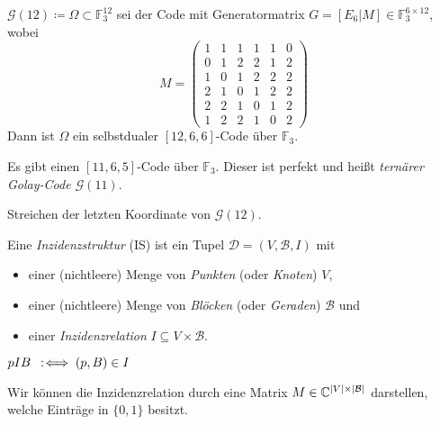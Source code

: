\documentclass{cheat-sheet}
\newcommand{\F}{\mathbb{F}} %
\newcommand{\Golay}{\mathcal{G}} %
\newcommand{\Design}{\mathcal{D}} %
\newcommand{\Blocks}{\mathcal{B}} %
\begin{document}

\begin{satz}
  $\Golay(12) \coloneqq \Omega \subset \F_3^{12}$ sei der Code mit Generatormatrix $G=[E_6|M] \in \F_3^{6 \times 12}$, wobei
  \[
    M = \begin{pmatrix}
      1 & 1 & 1 & 1 & 1 & 0 \\
      0 & 1 & 2 & 2 & 1 & 2 \\
      1 & 0 & 1 & 2 & 2 & 2 \\
      2 & 1 & 0 & 1 & 2 & 2 \\
      2 & 2 & 1 & 0 & 1 & 2 \\
      1 & 2 & 2 & 1 & 0 & 2
    \end{pmatrix}
  \]
  Dann ist $\Omega$ ein selbstdualer $[12, 6, 6]$-Code über $\F_3$.
\end{satz}


\begin{satz}
  Es gibt einen $[11, 6, 5]$-Code über $\F_3$. Dieser ist perfekt und heißt \emph{ternärer Golay-Code $\Golay(11)$}.
\end{satz}

\begin{konstr}
  Streichen der letzten Koordinate von $\Golay(12)$.
\end{konstr}


\begin{defn}
  Eine \emph{Inzidenzstruktur} (IS) ist ein Tupel $\Design = (V, \Blocks, I)$ mit
  \begin{itemize}
    \item einer (nichtleere) Menge von \emph{Punkten} (oder \textit{Knoten}) $V$,
    \item einer (nichtleere) Menge von \emph{Blöcken} (oder \textit{Geraden}) $\Blocks$ und
    \item einer \emph{Inzidenzrelation} $I \subseteq V \times \Blocks$.
  \end{itemize}
\end{defn}

\begin{nota}
  $p I B \enspace:\!\iff (p, B) \in I$
\end{nota}

\begin{bem}
  Wir können die Inzidenzrelation durch eine Matrix $M \in \C^{\abs{V} \times \abs{\Blocks}}$ darstellen, welche Einträge in $\{ 0, 1 \}$ besitzt.
\end{bem}
\end{document}
